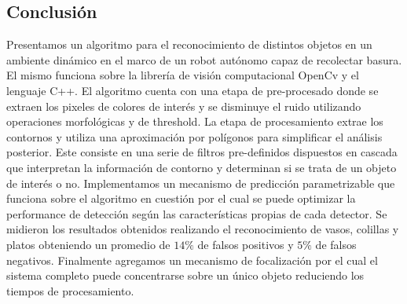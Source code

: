 \subsection{Conclusi\'on}
Presentamos un algoritmo para el reconocimiento de distintos objetos en 
un ambiente din\'amico en el marco de un robot aut\'onomo capaz de 
recolectar basura. El mismo funciona sobre la librer\'ia de visi\'on 
computacional OpenCv y el lenguaje C++.  El algoritmo cuenta
con una etapa de pre-procesado donde se extraen los pixeles de colores de inter\'es y se disminuye el ruido utilizando 
operaciones morfol\'ogicas y de threshold. La etapa de procesamiento extrae los contornos y utiliza una aproximaci\'on por pol\'igonos
para simplificar el an\'alisis posterior. Este consiste en una serie de 
filtros pre-definidos dispuestos en cascada que interpretan la 
informaci\'on de contorno y  determinan si se trata 
de un objeto de inter\'es o no. 
Implementamos un mecanismo de predicci\'on parametrizable que funciona 
sobre el algoritmo en cuesti\'on por el cual se puede optimizar la performance de 
detecci\'on seg\'un las caracter\'isticas propias de cada detector. Se 
midieron los resultados obtenidos realizando el reconocimiento de 
vasos, colillas y platos obteniendo un promedio de $14\%$ de falsos 
positivos  y $5\%$ de falsos negativos. Finalmente agregamos un mecanismo de focalizaci\'on por el cual 
el sistema completo puede concentrarse sobre un \'unico objeto reduciendo 
los tiempos de procesamiento. 


